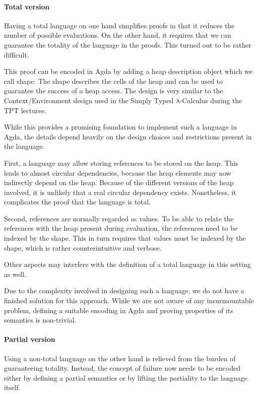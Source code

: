 \documentclass[12pt, a4paper, oneside]{article}
\begin{document}
\paragraph{Total version}
Having a total language on one hand simplifies proofs in that it reduces the number of possible evaluations.
On the other hand, it requires that we can guarantee the totality of the language in the proofs. This turned
out to be rather difficult.

This proof can be encoded in Agda by adding a heap description object which we call shape. The shape
describes the cells of the heap and can be used to guarantee the success of a heap access. The design
is very similar to the Context/Environment design used in the Simply Typed $\lambda$-Calculus
during the TPT lectures.

While this provides a promising foundation to implement such a language in Agda, the details depend
heavily on the design choices and restrictions present in the language.

First, a language may allow storing references to be stored on the heap. This leads to almost circular
dependencies, because the heap elements may now indirectly depend on the heap. Because of the different
versions of the heap involved, it is unlikely that a real circular dependency exists. Nonetheless,
it complicates the proof that the language is total.

Second, references are normally regarded as values. To be able to relate the references with the
heap present during evaluation, the references need to be indexed by the shape. This in turn requires
that values must be indexed by the shape, which is rather counterintuitive and verbose.

Other aspects may interfere with the definition of a total language in this setting as well.

Due to the complexity involved in designing such a language, we do not have a finished solution for this approach.
While we are not aware of any insurmountable problem, defining a suitable encoding in Agda
and proving properties of its semantics is non-trivial.


\paragraph{Partial version}
Using a non-total language on the other hand is relieved from the burden of guaranteeing totality.
Instead, the concept of failure now needs to be encoded either by defining a partial semantics
or by lifting the partiality to the language itself.
\end{document}
